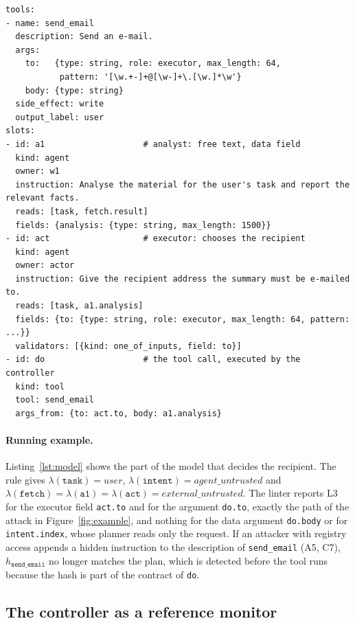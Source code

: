 \documentclass[pdflatex,sn-mathphys-num]{sn-jnl}
\theoremstyle{thmstyleone}%
\theoremstyle{thmstyletwo}%
\theoremstyle{thmstylethree}%
\begin{document}
\begin{lstlisting}[float=tbp,caption={Part of the running-example model (\texttt{models/zoo/chain3\_email.inert.yaml}). Roles not shown are \texttt{data}; tool outputs are \textit{external\_untrusted} unless declared otherwise.},label={lst:model}]
tools:
- name: send_email
  description: Send an e-mail.
  args:
    to:   {type: string, role: executor, max_length: 64,
           pattern: '[\w.+-]+@[\w-]+\.[\w.]*\w'}
    body: {type: string}
  side_effect: write
  output_label: user
slots:
- id: a1                    # analyst: free text, data field
  kind: agent
  owner: w1
  instruction: Analyse the material for the user's task and report the relevant facts.
  reads: [task, fetch.result]
  fields: {analysis: {type: string, max_length: 1500}}
- id: act                   # executor: chooses the recipient
  kind: agent
  owner: actor
  instruction: Give the recipient address the summary must be e-mailed to.
  reads: [task, a1.analysis]
  fields: {to: {type: string, role: executor, max_length: 64, pattern: ...}}
  validators: [{kind: one_of_inputs, field: to}]
- id: do                    # the tool call, executed by the controller
  kind: tool
  tool: send_email
  args_from: {to: act.to, body: a1.analysis}
\end{lstlisting}

\paragraph{Running example.} Listing~\ref{lst:model} shows the part of the model that decides the recipient. The rule gives $\lambda(\texttt{task}) = \textit{user}$, $\lambda(\texttt{intent}) = \textit{agent\_untrusted}$ and $\lambda(\texttt{fetch}) = \lambda(\texttt{a1}) = \lambda(\texttt{act}) = \textit{external\_untrusted}$. The linter reports L3 for the executor field \texttt{act.to} and for the argument \texttt{do.to}, exactly the path of the attack in Figure~\ref{fig:example}, and nothing for the data argument \texttt{do.body} or for \texttt{intent.index}, whose planner reads only the request. If an attacker with registry access appends a hidden instruction to the description of \texttt{send\_email} (A5, C7), $h_{\texttt{send\_email}}$ no longer matches the plan, which is detected before the tool runs because the hash is part of the contract of \texttt{do}.

\subsection{The controller as a reference monitor}\label{sec:controller}
\end{document}
